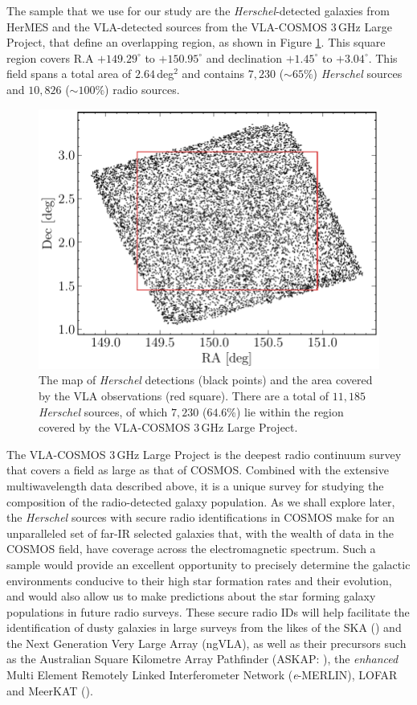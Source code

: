 The sample that we use for our study are the \textit{Herschel}-detected galaxies from HerMES and the VLA-detected sources from the VLA-COSMOS $3\,$GHz Large Project, that define an overlapping region, as shown in Figure \ref{fig:sky_map}. This square region covers R.A  $+149.29^{\circ}$ to $+150.95^{\circ}$ and declination $+1.45^{\circ}$ to $+3.04^{\circ}$. This field spans a total area of $2.64\,$deg$^2$ and contains $7,230$ ($\sim 65\%$) \textit{Herschel} sources and $10,826$ ($\sim 100\%$) radio sources.

\begin{figure}
	\centering
	\includegraphics[width=0.8\columnwidth]{Figures/sky_map.pdf}
	\caption[Map of the \textit{Herschel} and VLA observations in the COSMOS field]{The map of \textit{Herschel} detections (black points) and the area covered by the VLA observations (red square). There are a total of $11,185$ \textit{Herschel} sources, of which $7,230$ ($64.6$\%) lie within the region covered by the VLA-COSMOS $3\,$GHz Large Project.}
	\label{fig:sky_map}
\end{figure}

The VLA-COSMOS $3\,$GHz Large Project is the deepest radio continuum survey that covers a field as large as that of COSMOS. Combined with the extensive multiwavelength data described above, it is a unique survey for studying the composition of the radio-detected galaxy population. As we shall explore later, the \textit{Herschel} sources with secure radio identifications in COSMOS make for an unparalleled set of far-IR selected galaxies that, with the wealth of data in the COSMOS field, have coverage across the electromagnetic spectrum. Such a sample would provide an excellent opportunity to precisely determine the galactic environments conducive to their high star formation rates and their evolution, and would also allow us to make predictions about the star forming galaxy populations in future radio surveys. These secure radio IDs will help facilitate the identification of dusty galaxies in large surveys from the likes of the SKA (\citealt{Dewdney_2009}) and the Next Generation Very Large Array (ngVLA), as well as their precursors such as the Australian Square Kilometre Array Pathfinder (ASKAP: \citealt{Johnston_2007}), the \textit{enhanced} Multi Element Remotely Linked Interferometer Network (\textit{e}-MERLIN), LOFAR and MeerKAT (\citealt{Jonas_2009}).

